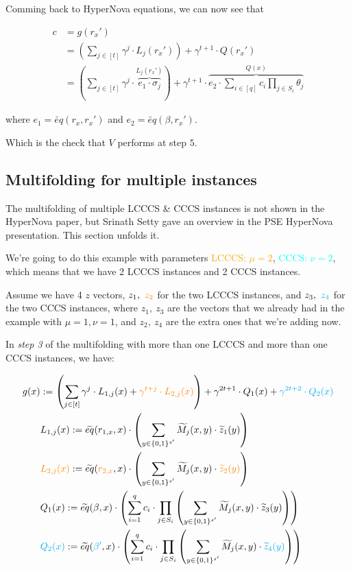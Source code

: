 \documentclass{article}
\theoremstyle{definition}
\begin{document}
\vspace{1cm}

Comming back to HyperNova equations, we can now see that

\begin{align*}
	c &= g(r_x')\\
	  &= \left( \sum_{j \in [t]} \gamma^j \cdot L_j(r_x') \right) + \gamma^{t+1} \cdot Q(r_x')\\
	  &= \left( \sum_{j \in [t]} \gamma^j \cdot \overbrace{e_1 \cdot \sigma_j}^{L_j(r_x')} \right) + \gamma^{t+1} \cdot \overbrace{e_2 \cdot \sum_{i \in [q]} c_i \prod_{j \in S_i} \theta_j}^{Q(x)}
\end{align*}

where $e_1 = \widetilde{eq}(r_x, r_x')$ and $e_2=\widetilde{eq}(\beta, r_x')$.

Which is the check that $V$ performs at step $5$.

\subsection{Multifolding for multiple instances}
The multifolding of multiple LCCCS \& CCCS instances is not shown in the HyperNova paper, but Srinath Setty gave an overview in the PSE HyperNova presentation. This section unfolds it.

We're going to do this example with parameters \textcolor{orange}{LCCCS: $\mu = 2$}, \textcolor{cyan}{CCCS: $\nu = 2$}, which means that we have 2 LCCCS instances and 2 CCCS instances.

Assume we have 4 $z$ vectors, $z_1,~ \textcolor{orange}{z_2}$ for the two LCCCS instances, and $z_3,~ \textcolor{cyan}{z_4}$ for the two CCCS instances, where $z_1,~z_3$ are the vectors that we already had in the example with $\mu=1,\nu=1$, and $z_2,~z_4$ are the extra ones that we're adding now.

In \emph{step 3} of the multifolding with more than one LCCCS and more than one CCCS instances, we have:

\begin{align*}
	g(x) &:= \left( \sum_{j \in [t]} \gamma^j \cdot L_{1,j}(x) + \textcolor{orange}{\gamma^{t+j} \cdot L_{2,j}(x)} \right)
+ \gamma^{2t+1} \cdot Q_1(x) + \textcolor{cyan}{\gamma^{2t+2} \cdot Q_2(x)} \\
	     &L_{1,j}(x) := \widetilde{eq}(r_{1,x}, x) \cdot \left(
	\sum_{y \in \{0,1\}^{s'}} \widetilde{M}_j(x, y) \cdot \widetilde{z}_1(y)
\right)\\
	     &\textcolor{orange}{L_{2,j}(x)} := \widetilde{eq}(\textcolor{orange}{r_{2,x}}, x) \cdot \left(
	\sum_{y \in \{0,1\}^{s'}} \widetilde{M}_j(x, y) \cdot \textcolor{orange}{\widetilde{z}_2(y)}
\right)\\
	     &Q_1(x) := \widetilde{eq}(\beta, x) \cdot \left(
\sum_{i=1}^q c_i \cdot \prod_{j \in S_i} \left( \sum_{y \in \{0, 1\}^{s'}} \widetilde{M}_j(x, y) \cdot \widetilde{z}_3(y) \right)\right)\\
	     &\textcolor{cyan}{Q_2(x)} := \widetilde{eq}(\textcolor{cyan}{\beta'}, x) \cdot \left(
	\sum_{i=1}^q c_i \cdot \prod_{j \in S_i} \left( \sum_{y \in \{0, 1\}^{s'}} \widetilde{M}_j(x, y) \cdot \textcolor{cyan}{\widetilde{z}_4(y)} \right)\right)
\end{align*}
\end{document}
